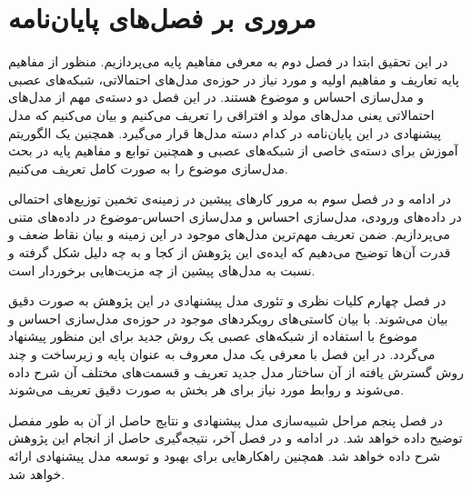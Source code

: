 \section{مروری بر فصل‌های پایان‌نامه}
در این تحقیق ابتدا در فصل دوم به معرفی‌ مفاهیم پایه می‌‌پردازیم. منظور از مفاهیم پایه ‌تعاریف و مفاهیم اولیه‌ و مورد نیاز در حوزه‌ی مدل‌های احتمالاتی، شبکه‌های عصبی و مدل‌سازی احساس و موضوع هستند. در این فصل دو دسته‌ی مهم از مدل‌های احتمالاتی یعنی‌ مدل‌های مولد و افتراقی را تعریف می‌‌کنیم و بیان می‌کنیم که مدل پیشنهادی در این پایان‌‌نامه در کدام دسته‌ مدل‌ها قرار می‌گیرد. همچنین یک الگوریتم آموزش برای دسته‌ی خاصی‌ از شبکه‌های عصبی و همچنین توابع و مفاهیم پایه در بحث مدل‌سازی موضوع را به صورت کامل تعریف می‌کنیم.

در ادامه و در فصل سوم به مرور کارهای پیشین در زمینه‌ی تخمین توزیع‌های احتمالی‌ در داده‌های ورودی، مدل‌سازی احساس و مدل‌سازی احساس‌-موضوع در داده‌های متنی می‌‌پردازیم. ضمن تعریف مهم‌ترین مدل‌های موجود در این زمینه و بیان نقاط ضعف و قدرت آن‌ها توضیح می‌‌دهیم که ایده‌ی این پژوهش از کجا و به چه دلیل شکل گرفته و نسبت به مدل‌های پیشین از چه مزیت‌هایی برخوردار است.

در فصل چهارم کلیات نظری و تئوری مدل پیشنهادی در این پژوهش به صورت دقیق بیان می‌‌شوند. با بیان کاستی‌های رویکردهای موجود در حوزه‌ی مدل‌سازی احساس و موضوع با استفاده از شبکه‌های عصبی یک روش جدید برای این منظور پیشنهاد می‌‌گردد. در این فصل با معرفی‌ یک مدل معروف به عنوان پایه و زیرساخت و چند روش گسترش یافته از آن ساختار مدل جدید تعریف و قسمت‌های مختلف آن شرح داده می‌‌شوند و روابط مورد نیاز برای هر بخش به صورت دقیق تعریف می‌‌شوند.

 در فصل پنجم مراحل شبیه‌سازی مدل پیشنهادی و نتایج حاصل از آن به طور مفصل توضیح داده خواهد شد.
 در ادامه و در فصل آخر، نتیجه‌گیری حاصل از انجام این پژوهش شرح داده خواهد شد. همچنین راهکارهایی برای بهبود و توسعه مدل پیشنهادی ارائه خواهد شد.
\thispagestyle{empty} 













